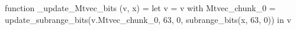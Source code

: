 function _update_Mtvec_bits (v, x) = let v = { v with Mtvec_chunk_0 = update_subrange_bits(v.Mtvec_chunk_0, 63, 0, subrange_bits(x, 63, 0)) } in
  v
